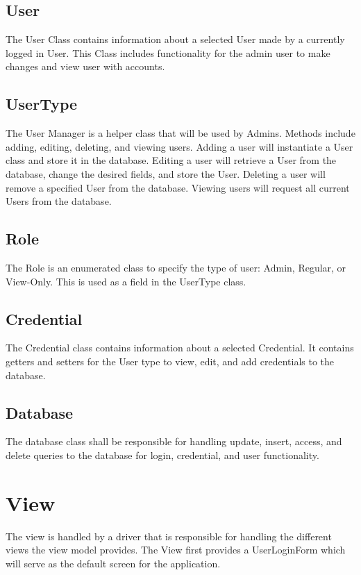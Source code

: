 \documentclass[letterpaper,12pt,oneside,listof=totoc]{scrreprt}
\begin{document}
\subsection{User}
The User Class contains information about a selected User made by a currently logged in User. This Class includes functionality for the admin user to make changes and view user with accounts. 

\subsection{UserType}
The User Manager is a helper class that will be used by Admins. Methods include adding, editing, deleting, and viewing users. Adding a user will instantiate a User class and store it in the database. Editing a user will retrieve a User from the database, change the desired fields, and store the User. Deleting a user will remove a specified User from the database. Viewing users will request all current Users from the database. 

\subsection{Role}
The Role is an enumerated class to specify the type of user: Admin, Regular, or View-Only. This is used as a field in the UserType class. 

\subsection{Credential}
The Credential class contains information about a selected Credential. It contains getters and setters for the User type to view, edit, and add credentials to the database.

\subsection{Database}
The database class shall be responsible for handling update, insert, access, and delete queries to the database for login, credential, and user functionality.

\section{View}
The view is handled by a driver that is responsible for handling the different views the view model provides. The View first provides a UserLoginForm which will serve as the default screen for the application.
\end{document}
